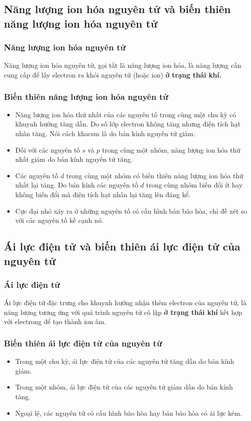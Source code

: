 \subsection{Năng lượng ion hóa nguyên tử và biến thiên năng lượng ion hóa nguyên tử}
\subsubsection{Năng lượng ion hóa nguyên tử}
Năng lượng ion hóa nguyên tử, gọi tắt là năng lượng ion hóa, là năng lượng cần cung cấp để lấy electron ra khỏi nguyên tử (hoặc ion) \textbf{ở trạng thái khí.}
\subsubsection{Biến thiên năng lượng ion hóa nguyên tử}
\begin{itemize}
\item Năng lượng ion hóa thứ nhất của các nguyên tố trong cùng một chu kỳ có khuynh hướng tăng dần. Do số lớp electron không tăng nhưng điện tích hạt nhân tăng. Nói cách khacsm là do bán kính nguyên tử giảm.
\item Đối với các nguyên tố $s$ và $p$ trong cùng một nhóm, năng lượng ion hóa thứ nhất giảm do bán kính nguyên tử tăng.
\item Các nguyên tố $d$ trong cùng một nhóm có biến thiên năng lượng ion hóa thứ nhất lại tăng. Do bán kính các nguyên tố $d$ trong cùng nhóm biến đổi ít hay không biến đổi mà điện tích hạt nhân lại tăng lên đáng kể.
\item Cực đại nhỏ xảy ra ở những nguyên tố có cấu hình bán bão hòa, chỉ đề xét so với các nguyên tố kề cạnh nó.
\end{itemize}
\subsection{Ái lực điện tử và biến thiên ái lực điện tử của nguyên tử}
\subsubsection{Ái lực điện tử}
Ái lực điện tử đặc trưng cho khuynh hướng nhận thêm electron của nguyên tử, là năng lượng tương ứng với quá trình nguyên tử cô lập \textbf{ở trạng thái khí} kết hợp với electrong để tạo thành ion âm. 
\subsubsection{Biến thiên ái lực điện tử của nguyên tử}
\begin{itemize}
\item Trong một chu kỳ, ái lực điện tử của các nguyên tử tăng dần do bán kính giảm.
\item Trong một nhóm, ái lực điện tử của các nguyên tử giảm dần do bán kính tăng.
\item Ngoại lệ, các nguyên tử có cấu hình bão hòa hay bán bão hòa có ái lực kém.
\end{itemize}
